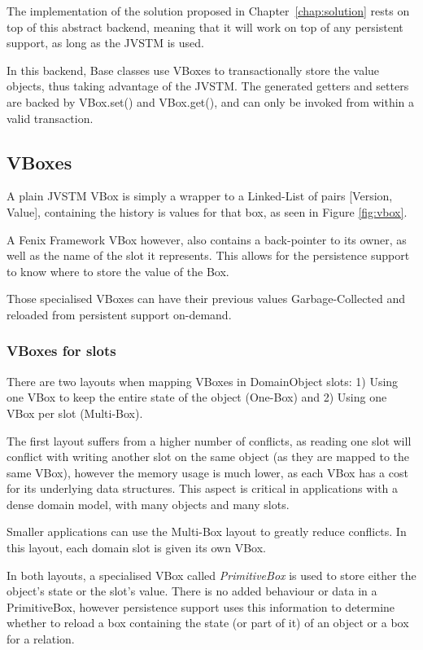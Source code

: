 The implementation of the solution proposed in
Chapter~\ref{chap:solution} rests on top of this abstract backend,
meaning that it will work on top of any persistent support, as long as
the JVSTM is used.

In this backend, Base classes use VBoxes to transactionally store the
value objects, thus taking advantage of the JVSTM. The generated
getters and setters are backed by VBox.set() and VBox.get(), and can
only be invoked from within a valid transaction.

\subsection{VBoxes}

A plain JVSTM VBox is simply a wrapper to a Linked-List of pairs
[Version, Value], containing the history is values for that
box, as seen in Figure \ref{fig:vbox}.

A Fenix Framework VBox however, also contains a back-pointer to its
owner, as well as the name of the slot it represents. This allows for
the persistence support to know where to store the value of the Box.

Those specialised VBoxes can have their previous values
Garbage-Collected and reloaded from persistent support on-demand.

\subsubsection{VBoxes for slots}

There are two layouts when mapping VBoxes in DomainObject slots: 1)
Using one VBox to keep the entire state of the object (One-Box) and 2)
Using one VBox per slot (Multi-Box).

The first layout suffers from a higher number of conflicts, as reading
one slot will conflict with writing another slot on the same object
(as they are mapped to the same VBox), however the memory usage is
much lower, as each VBox has a cost for its underlying data
structures. This aspect is critical in applications with a dense
domain model, with many objects and many slots.

Smaller applications can use the Multi-Box layout to greatly reduce
conflicts. In this layout, each domain slot is given its own VBox.

In both layouts, a specialised VBox called {\it PrimitiveBox} is
used to store either the object's state or the slot's value. There is
no added behaviour or data in a PrimitiveBox, however persistence
support uses this information to determine whether to reload a box
containing the state (or part of it) of an object or a box for a relation.

